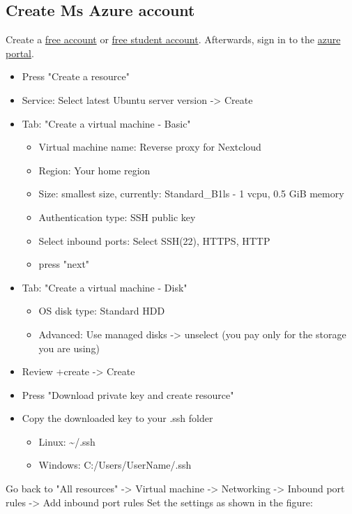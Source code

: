 \documentclass[a4paper,12pt]{article}
\begin{document}
	\subsection{Create Ms Azure account}
	Create a \href{https://azure.microsoft.com/en-us/free/}{free account} or \href{https://azure.microsoft.com/en-au/free/students/}{free student account}.
	Afterwards, sign in to the \href{https://portal.azure.com}{azure portal}. 
	\begin{itemize}
		\item 	Press "Create a resource"
		\item Service: Select latest Ubuntu server version -> Create
		\item Tab: "Create a virtual machine - Basic" 
		\begin{itemize}
			\item Virtual machine name: Reverse proxy for Nextcloud
			\item Region: Your home region
			\item Size: smallest size, currently: Standard\_B1ls - 1 vcpu, 0.5 GiB memory
			\item Authentication type: SSH public key
			\item Select inbound ports: Select SSH(22), HTTPS, HTTP
			\item press "next"
		\end{itemize}
		\item Tab: "Create a virtual machine - Disk" 
		\begin{itemize}
			\item OS disk type: Standard HDD
			\item Advanced: Use managed disks -> unselect (you pay only for the storage you are using)
		\end{itemize}
		\item Review +create -> Create
		\item Press "Download private key and create resource"
		\item Copy the downloaded key to your .ssh folder
		\begin{itemize}
			\item Linux: \textasciitilde/.ssh
			\item Windows: C:/Users/UserName/.ssh
		\end{itemize}
	\end{itemize}
	Go back to "All resources" -> Virtual machine -> Networking -> Inbound port rules -> Add inbound port rules
	Set the settings as shown in the figure:
\end{document}
